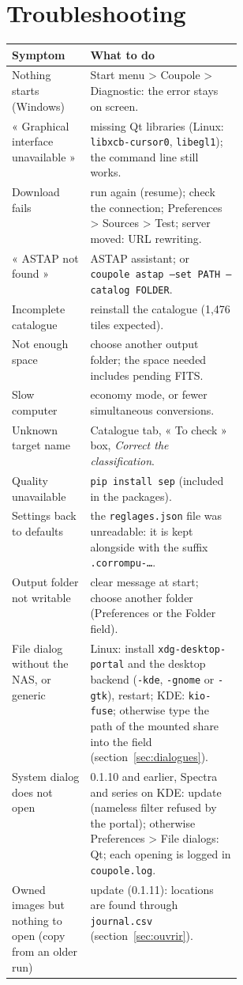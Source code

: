 \section{Troubleshooting}
\begin{center}\small
\begin{tabularx}{\linewidth}{@{}>{\raggedright}p{0.34\linewidth}X@{}}
\toprule
\textbf{Symptom} & \textbf{What to do}\\
\midrule
Nothing starts (Windows) & Start menu > Coupole > Diagnostic: the error stays on screen.\\
« Graphical interface unavailable » & missing Qt libraries (Linux: \texttt{libxcb-cursor0}, \texttt{libegl1}); the command line still works.\\
Download fails & run again (resume); check the connection; Preferences > Sources > Test; server moved: URL rewriting.\\
« ASTAP not found » & ASTAP assistant; or \texttt{coupole astap --set PATH --catalog FOLDER}.\\
Incomplete catalogue & reinstall the catalogue (1,476 tiles expected).\\
Not enough space & choose another output folder; the space needed includes pending FITS.\\
Slow computer & economy mode, or fewer simultaneous conversions.\\
Unknown target name & Catalogue tab, « To check » box, \emph{Correct the classification}.\\
Quality unavailable & \texttt{pip install sep} (included in the packages).\\
Settings back to defaults & the \texttt{reglages.json} file was unreadable: it is kept alongside with the suffix \texttt{.corrompu-…}.\\
Output folder not writable & clear message at start; choose another folder (Preferences or the Folder field).\\
File dialog without the NAS, or generic & Linux: install \texttt{xdg-desktop-portal} and the desktop backend (\texttt{-kde}, \texttt{-gnome} or \texttt{-gtk}), restart; KDE: \texttt{kio-fuse}; otherwise type the path of the mounted share into the field (section~\ref{sec:dialogues}).\\
System dialog does not open & 0.1.10 and earlier, Spectra and series on KDE: update (nameless filter refused by the portal); otherwise Preferences > File dialogs: Qt; each opening is logged in \texttt{coupole.log}.\\
Owned images but nothing to open (copy from an older run) & update (0.1.11): locations are found through \texttt{journal.csv} (section~\ref{sec:ouvrir}).\\

\end{tabularx}
\end{center}
